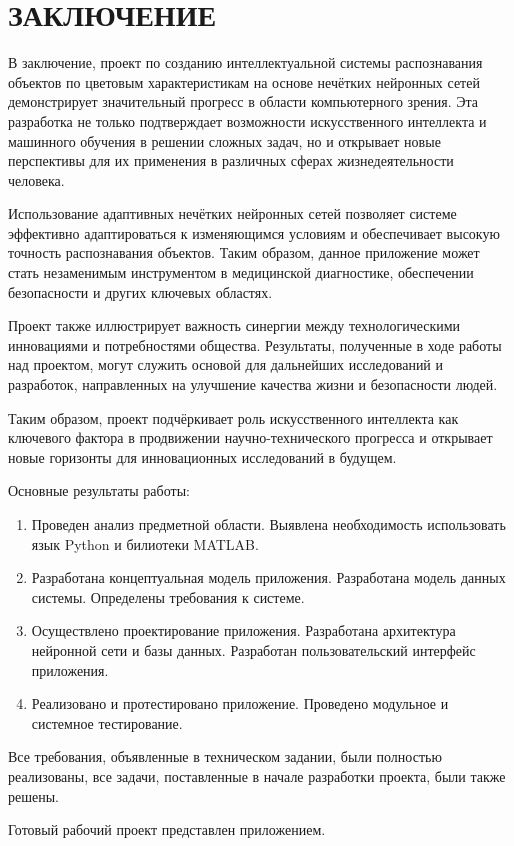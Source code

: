 \section*{ЗАКЛЮЧЕНИЕ}

В заключение, проект по созданию интеллектуальной системы распознавания объектов по цветовым характеристикам на основе нечётких нейронных сетей демонстрирует значительный прогресс в области компьютерного зрения. Эта разработка не только подтверждает возможности искусственного интеллекта и машинного обучения в решении сложных задач, но и открывает новые перспективы для их применения в различных сферах жизнедеятельности человека.

Использование адаптивных нечётких нейронных сетей позволяет системе эффективно адаптироваться к изменяющимся условиям и обеспечивает высокую точность распознавания объектов. Таким образом, данное приложение может стать незаменимым инструментом в медицинской диагностике, обеспечении безопасности и других ключевых областях.

Проект также иллюстрирует важность синергии между технологическими инновациями и потребностями общества. Результаты, полученные в ходе работы над проектом, могут служить основой для дальнейших исследований и разработок, направленных на улучшение качества жизни и безопасности людей.

Таким образом, проект подчёркивает роль искусственного интеллекта как ключевого фактора в продвижении научно-технического прогресса и открывает новые горизонты для инновационных исследований в будущем.

Основные результаты работы:

\begin{enumerate}
\item Проведен анализ предметной области. Выявлена необходимость использовать язык Python и билиотеки MATLAB.
\item Разработана концептуальная модель приложения. Разработана модель данных системы. Определены требования к системе.
\item Осуществлено проектирование приложения. Разработана архитектура нейронной сети и базы данных. Разработан пользовательский интерфейс приложения.
\item Реализовано и протестировано приложение. Проведено модульное и системное тестирование.
\end{enumerate}

Все требования, объявленные в техническом задании, были полностью реализованы, все задачи, поставленные в начале разработки проекта, были также решены.

Готовый рабочий проект представлен приложением. 
